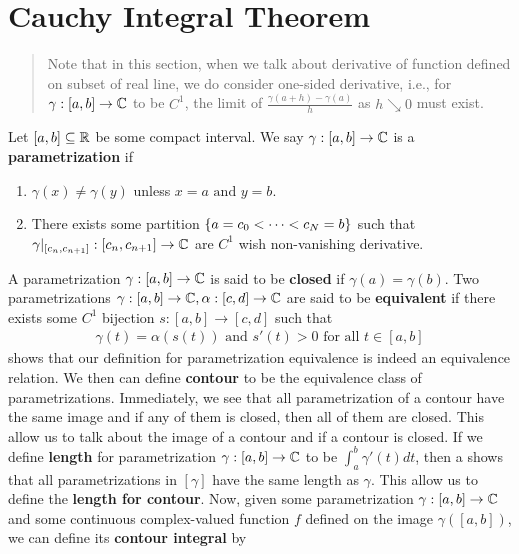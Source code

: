 \documentclass{report}
\begin{document}
\section{Cauchy Integral Theorem}
\begin{abstract}
Note that in this section, when we talk about derivative of function defined on subset of real line, we do consider one-sided derivative, i.e., for $\gamma :[a,b]\rightarrow \mathbb{C}$ to be $C^1$, the limit of $\frac{\gamma (a+h)-\gamma  (a)}{h}$ as $h\searrow 0$ must exist. 
\end{abstract}
\begin{mdframed}
Let $[a,b]\subseteq \mathbb{R}$ be some compact interval. We say $\gamma :[a,b]\rightarrow \mathbb{C}$ is a \textbf{parametrization} if 
\begin{enumerate}[label=(\alph*)]
  \item $\gamma (x)\neq \gamma (y)$ unless $x=a\text{ and }y=b$. 
  \item There exists some partition $\{ a=c_0<\cdots <c_N=b \}$ such that $\gamma|_{[c_n,c_{n+1}]}:[c_n,c_{n+1}]\rightarrow \mathbb{C}$ are $C^1$ wish non-vanishing derivative. 
\end{enumerate}
A parametrization $\gamma :[a,b]\rightarrow \mathbb{C}$ is said to be \textbf{closed} if $\gamma(a)=\gamma (b)$. Two parametrizations $\gamma :[a,b]\rightarrow \mathbb{C},\alpha :[c,d]\rightarrow \mathbb{C}$ are said to be \textbf{equivalent} if there exists some $C^1$ bijection  $s:[a,b]\rightarrow [c,d]$ such that 
\begin{align*}
\gamma (t)= \alpha (s(t))\text{ and }s'(t)>0\text{ for all }t\in [a,b]
\end{align*}
 shows that our definition for parametrization equivalence is indeed an equivalence relation. We then can define \textbf{contour} to be the equivalence class of parametrizations. Immediately, we see that all parametrization of a contour have the same image and if any of them is closed, then all of them are closed. This allow us to talk about the image of a contour and if a contour is closed. If we define \textbf{length} for parametrization $\gamma :[a,b]\rightarrow \mathbb{C}$ to be $\int_a^b \gamma  '(t)dt$, then a  shows that all parametrizations in $[\gamma ]$ have the same length as $\gamma $. This allow us to define the \textbf{length for contour}. Now, given some parametrization $\gamma :[a,b]\rightarrow \mathbb{C}$ and some continuous complex-valued function $f$ defined on the image $\gamma ([a,b])$, we can define its \textbf{contour integral} by 

\end{mdframed}
\end{document}
